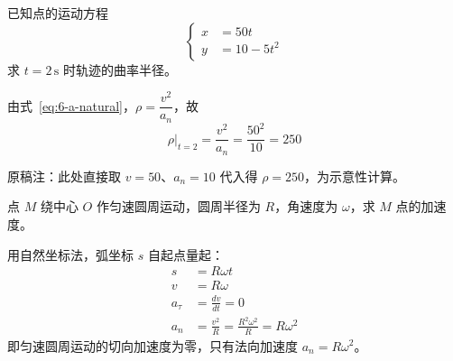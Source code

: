 \begin{example}[由运动方程求轨迹的曲率半径]
已知点的运动方程
\begin{equation}
  \left\{\begin{aligned}
    x &= 50t \\
    y &= 10 - 5t^2
  \end{aligned}\right.
  \label{eq:6-ex2-given}
\end{equation}
求 $t = 2\,\mathrm{s}$ 时轨迹的曲率半径。
\end{example}

\begin{solution}
由式~\eqref{eq:6-a-natural}，$\rho = \dfrac{v^2}{a_n}$，故
\begin{equation}
  \rho\big|_{t=2} = \frac{v^2}{a_n} = \frac{50^2}{10} = 250
  \label{eq:6-ex2-rho}
\end{equation}
\begin{remark}
原稿注：此处直接取 $v = 50$、$a_n = 10$ 代入得 $\rho = 250$，为示意性计算。
\end{remark}
\end{solution}

\begin{example}
点 $M$ 绕中心 $O$ 作匀速圆周运动，圆周半径为 $R$，角速度为 $\omega$，求 $M$ 点的加速度。
\end{example}

\begin{center}
\end{center}

\begin{solution}
用自然坐标法，弧坐标 $s$ 自起点量起：
\begin{equation}
  \begin{aligned}
    s &= R\omega t \\
    v &= R\omega \\
    a_\tau &= \frac{dv}{dt} = 0 \\
    a_n &= \frac{v^2}{R} = \frac{R^2\omega^2}{R} = R\omega^2
  \end{aligned}
  \label{eq:6-ex3-uniform}
\end{equation}
即匀速圆周运动的切向加速度为零，只有法向加速度 $a_n = R\omega^2$。
\end{solution}

